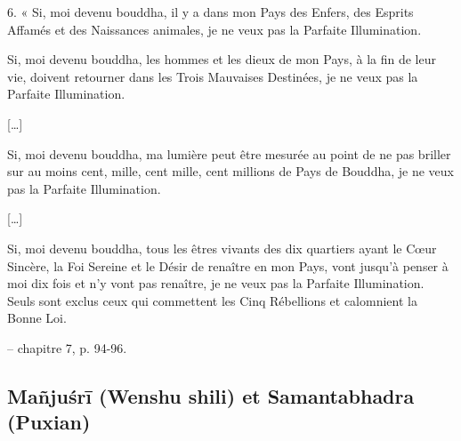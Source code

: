 \begin{singlequote}
    6.	« Si, moi devenu bouddha, il y a dans mon Pays des Enfers, des Esprits Affamés et des Naissances animales, je ne veux pas la Parfaite Illumination.

Si, moi devenu bouddha, les hommes et les dieux de mon Pays, à la fin de leur vie, doivent retourner dans les Trois Mauvaises Destinées, je ne veux pas la Parfaite Illumination.
 
[…]

Si, moi devenu bouddha, ma lumière peut être mesurée au point de ne pas briller sur au moins cent, mille, cent mille, cent millions de Pays de Bouddha, je ne veux pas la Parfaite Illumination.

[…]

Si, moi devenu bouddha, tous les êtres vivants des dix quartiers ayant le Cœur Sincère, la Foi Sereine et le Désir de renaître en mon Pays, vont jusqu’à penser à moi dix fois et n’y vont pas renaître, je ne veux pas la Parfaite Illumination. Seuls sont exclus ceux qui commettent les Cinq Rébellions et calomnient la Bonne Loi.

-- chapitre 7, p. 94-96.
\end{singlequote}



\subsection{Mañjuśrī (Wenshu shili) et Samantabhadra (Puxian)}




